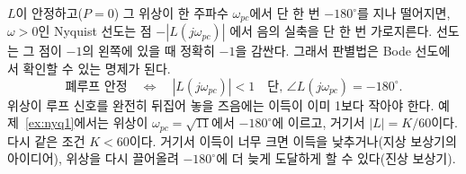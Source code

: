 \documentclass[11pt]{article}
\begin{document}
\begin{remark}\label{rem:bodenyq}
$L$이 안정하고($P=0$) 그 위상이 한 주파수 $\omega_{pc}$에서 단 한 번
$-180^\circ$를 지나 떨어지면, $\omega>0$인 Nyquist 선도는 점 $-|L(j\omega_{pc})|$
에서 음의 실축을 단 한 번 가로지른다. 선도는 그 점이 $-1$의 왼쪽에 있을 때 정확히
$-1$을 감싼다. 그래서 판별법은 Bode 선도에서 확인할 수 있는 명제가 된다.
\[
   \text{폐루프 안정}
   \quad\Longleftrightarrow\quad
   |L(j\omega_{pc})| < 1
   \quad\text{단, } \angle L(j\omega_{pc}) = -180^\circ .
\]
위상이 루프 신호를 완전히 뒤집어 놓을 즈음에는 이득이 이미 1보다 작아야 한다.
예제~\ref{ex:nyq1}에서는 위상이 $\omega_{pc}=\sqrt{11}$에서 $-180^\circ$에
이르고, 거기서 $|L|=K/60$이다. 다시 같은 조건 $K<60$이다. 거기서 이득이 너무
크면 이득을 낮추거나(지상 보상기의 아이디어), 위상을 다시 끌어올려 $-180^\circ$에
더 늦게 도달하게 할 수 있다(진상 보상기).
\end{remark}
\end{document}
